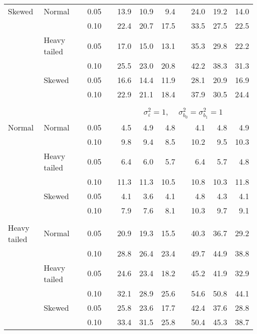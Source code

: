 \begin{table}[ht]
\begin{scriptsize}
\begin{center}
\begin{tabular}{ll p{.1cm} c p{.1cm} rrr p{.1cm} rrr}
Skewed       & Normal       && 0.05 &&   13.9 & 10.9 & 9.4 &   & 24.0 & 19.2 & 14.0 \\ 
             &              && 0.10 &&   22.4 & 20.7 & 17.5 &   & 33.5 & 27.5 & 22.5 \\ 
             & Heavy tailed && 0.05 &&   17.0 & 15.0 & 13.1 &   & 35.3 & 29.8 & 22.2 \\ 
             &              && 0.10 &&   25.5 & 23.0 & 20.8 &   & 42.2 & 38.3 & 31.3 \\ 
             & Skewed       && 0.05 &&   16.6 & 14.4 & 11.9 &   & 28.1 & 20.9 & 16.9 \\ 
             &              && 0.10 &&   22.9 & 21.1 & 18.4 &   & 37.9 & 30.5 & 24.4 \\ 

&&&&&&&&&&&\\
& && && \multicolumn{7}{c}{$\sigma_{\varepsilon}^2 = 1$, \ \ $\sigma_{b_0}^2 = \sigma_{b_1}^2 = 1$} \\ \cline{6-12}
\rowcolor{gray!20}Normal       & Normal       && 0.05 &&   4.5 & 4.9 & 4.8 &   & 4.1 & 4.8 & 4.9 \\ 
\rowcolor{gray!20}             &              && 0.10 &&   9.8 & 9.4 & 8.5 &   & 10.2 & 9.5 & 10.3 \\ 
\rowcolor{gray!20}             & Heavy tailed && 0.05 &&   6.4 & 6.0 & 5.7 &   & 6.4 & 5.7 & 4.8 \\ 
\rowcolor{gray!20}             &              && 0.10 &&   11.3 & 11.3 & 10.5 &   & 10.8 & 10.3 & 11.8 \\ 
\rowcolor{gray!20}             & Skewed       && 0.05 &&   4.1 & 3.6 & 4.1 &   & 4.8 & 4.3 & 4.1 \\ 
\rowcolor{gray!20}             &              && 0.10 &&   7.9 & 7.6 & 8.1 &   & 10.3 & 9.7 & 9.1 \\ 
&&&&&&&&&&&\\
Heavy tailed & Normal       && 0.05 &&   20.9 & 19.3 & 15.5 &   & 40.3 & 36.7 & 29.2 \\ 
             &              && 0.10 &&   28.8 & 26.4 & 23.4 &   & 49.7 & 44.9 & 38.8 \\ 
             & Heavy tailed && 0.05 &&   24.6 & 23.4 & 18.2 &   & 45.2 & 41.9 & 32.9 \\ 
             &              && 0.10 &&   32.1 & 28.9 & 25.6 &   & 54.6 & 50.8 & 44.1 \\ 
             & Skewed       && 0.05 &&   25.8 & 23.6 & 17.7 &   & 42.4 & 37.6 & 28.8 \\ 
             &              && 0.10 &&   33.4 & 31.5 & 25.8 &   & 50.4 & 45.3 & 38.7 \\ 

\end{tabular}
\end{center}
\end{scriptsize}
\end{table}
